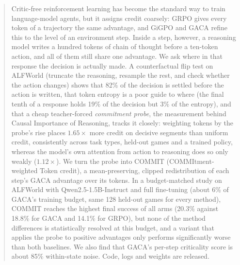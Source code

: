 \begin{abstract}
Critic-free reinforcement learning has become the standard way to train language-model agents, but it
assigns credit coarsely: GRPO gives every token of a trajectory the same advantage, and GiGPO and
GACA refine this to the level of an environment step. Inside a step, however, a reasoning model
writes a hundred tokens of chain of thought before a ten-token action, and all of them still share one
advantage. We ask where in that response the decision is actually made. A counterfactual flip test on
ALFWorld (truncate the reasoning, resample the rest, and check whether the action changes) shows that
82\% of the decision is settled before the action is written, that token entropy is a poor guide to
where (the final tenth of a response holds 19\% of the decision but 3\% of the entropy), and that a cheap
teacher-forced \emph{commitment probe}, the measurement behind Causal Importance of Reasoning, tracks
it closely: weighting tokens by the probe's rise places $1.65\times$ more credit on decisive segments
than uniform credit, consistently across task types, held-out games and a trained policy, whereas the
model's own attention from action to reasoning does so only weakly ($1.12\times$). We turn the probe into COMMIT (COMMItment-weighted Token credit), a mean-preserving,
clipped redistribution of each step's GACA advantage over its tokens. In a budget-matched study on
ALFWorld with Qwen2.5-1.5B-Instruct and full fine-tuning (about 6\% of GACA's training budget, same
128 held-out games for every method), COMMIT reaches the highest final success of all
arms (20.3\% against 18.8\% for GACA and 14.1\% for GRPO), but none of the method differences is
statistically resolved at this budget, and a variant that applies the probe to positive advantages only
performs significantly worse than both baselines. We also find that
GACA's per-step criticality score is about 85\% within-state noise. Code, logs and weights are released.
\end{abstract}
